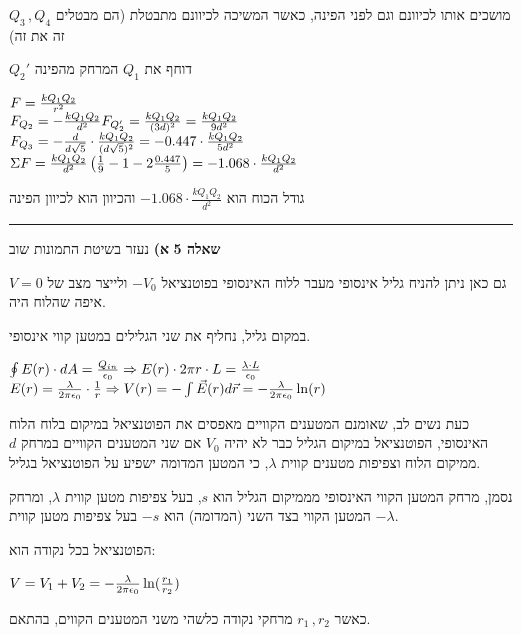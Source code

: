 \documentclass[14pt]{extarticle}
\makeatletter
\newenvironment{lefteqs}{%
    \begin{english}%
    \begin{flushleft}%
    \renewcommand{\arraystretch}{1.3}%
    $\begin{array}{@{}l@{}}%
}{%
    \end{array}$%
    \end{flushleft}%
    \end{english}%
}
\makeatother
\begin{document}
$Q_3 \, , Q_4$ מושכים אותו לכיוונם וגם לפני הפינה, כאשר המשיכה לכיוונם מתבטלת (הם מבטלים זה את זה)

$Q_2'$ דוחף את $Q_1$ המרחק מהפינה

\begin{lefteqs}
    F=\frac{kQ_1Q_2}{r^2} \\
    F_{Q_2} = -\frac{kQ_1Q_2}{d^2}
    F_{Q_2'} = \frac{kQ_1Q_2}{(3d)^2} = \frac{kQ_1Q_2}{9d^2} \\
    F_{Q_3} = -\frac{d}{d\sqrt{5}} \cdot \frac{kQ_1Q_2}{(d\sqrt{5})^2} = -0.447 \cdot \frac{kQ_1Q_2}{5d^2} \\
    \Sigma F = \frac{kQ_1Q_2}{d^2} \left( \frac{1}{9} -1 -2\frac{0.447}{5} \right) = -1.068 \cdot \frac{kQ_1Q_2}{d^2} \\
\end{lefteqs}
גודל הכוח הוא $-1.068 \cdot \frac{kQ_1Q_2}{d^2}$ והכיוון הוא לכיוון הפינה

\vspace{3em}
\hrule
\vspace{2em}

\textbf{\large שאלה 5}
\textbf{א)} 
נעזר בשיטת התמונות שוב

גם כאן ניתן להניח גליל אינסופי מעבר ללוח האינסופי בפוטנציאל $-V_0$ ולייצר מצב של $V=0$ איפה שהלוח היה.

במקום גליל, נחליף את שני הגלילים במטען קווי אינסופי.
\begin{lefteqs}
    \oint E(r) \cdot dA = \frac{Q_{in}}{\epsilon_0} \Rightarrow E(r) \cdot 2\pi r \cdot L  = \frac{\lambda \cdot L}{\epsilon_0} \\
    E(r) = \frac{\lambda}{2\pi \epsilon_0} \cdot \frac{1}{r} \Rightarrow V(r) = -\int \vec{E}(r) d\vec{r} = -\frac{\lambda}{2\pi \epsilon_0} \ln(r) \\
\end{lefteqs}
כעת נשים לב, שאומנם המטענים הקוויים מאפסים את הפוטנציאל במיקום בלוח הלוח האינסופי,
הפוטנציאל במיקום הגליל כבר לא יהיה $V_0$ אם שני המטענים הקוויים במרחק $d$ ממיקום הלוח
וצפיפות מטענים קווית $\lambda$, כי המטען המדומה ישפיע על הפוטנציאל בגליל.

נסמן, מרחק המטען הקווי האינסופי מממיקום הגליל הוא $s$, בעל צפיפות מטען קווית $\lambda$, ומרחק המטען הקווי בצד השני (המדומה) הוא $-s$ בעל צפיפות מטען קווית $-\lambda$.

הפוטנציאל בכל נקודה הוא:

\begin{lefteqs}
    V=V_1 + V_2 = -\frac{\lambda}{2\pi \epsilon_0} \ln(\frac{r_1}{r_2})
\end{lefteqs}
כאשר $r_1 \, , r_2$ מרחקי נקודה כלשהי משני המטענים הקווים, בהתאם.
\end{document}
